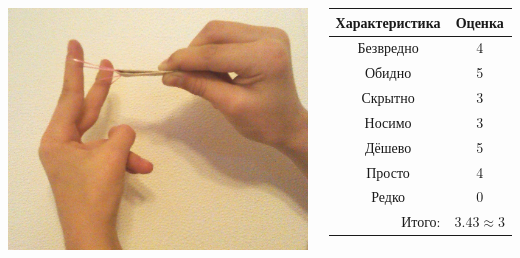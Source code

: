 \begin{frame} %
    \begin{columns}
            \begin{center}
                \includegraphics[width=\textwidth]{fig/slingshot}
            \end{center}
            
            \begin{center}
                \begin{tabular}{c|c}
                    \hline\hline
                    Характеристика              & Оценка\\ \hline\hline
                    Безвредно                   & 4 \\
                    Обидно                      & 5 \\
                    Скрытно                     & 3 \\
                    Носимо                      & 3 \\
                    Дёшево                      & 5 \\
                    Просто                      & 4 \\ 
                    Редко                       & 0 \\ \hline
                    \multicolumn{1}{r|}{Итого:} & $3.43\approx 3$ \\
                \end{tabular}
            \end{center}
    \end{columns}    
\end{frame}



